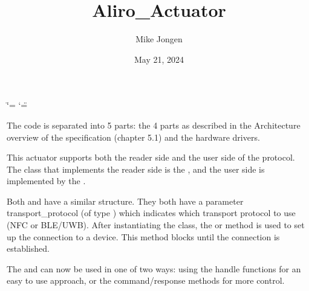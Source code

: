 \documentclass[letterpaper,10pt,english]{sphinxmanual}
\title{Aliro\_Actuator}
\date{May 21, 2024}
\author{Mike Jongen}
\begin{document}
\ifdefined\shorthandoff
  \ifnum\catcode`\=\string=\active\shorthandoff{=}\fi
  \ifnum\catcode`\"=\active{}\fi
\fi

\pagestyle{empty}
\sphinxmaketitle
\pagestyle{plain}
\sphinxtableofcontents
\pagestyle{normal}
\label{\detokenize{index::doc}}


\sphinxAtStartPar
The code is separated into 5 parts: the 4 parts as described in the Architecture
overview of the specification (chapter 5.1) and the hardware drivers.

\sphinxAtStartPar
This actuator supports both the reader side and the user side of the protocol. The class
that implements the reader side is the
{\hyperref[\detokenize{aliro_actuator.access_protocol.reader:aliro_actuator.access_protocol.reader.Reader}]{}}, and the user side is
implemented by the {\hyperref[\detokenize{aliro_actuator.access_protocol.user_device:aliro_actuator.access_protocol.user_device.UserDevice}]{}}.

\sphinxAtStartPar
Both {\hyperref[\detokenize{aliro_actuator.access_protocol.reader:aliro_actuator.access_protocol.reader.Reader}]{}} and
{\hyperref[\detokenize{aliro_actuator.access_protocol.user_device:aliro_actuator.access_protocol.user_device.UserDevice}]{}} have a similar structure.
They both have a parameter transport\_protocol (of type {\hyperref[\detokenize{aliro_actuator.access_protocol.defines:aliro_actuator.access_protocol.defines.TransportProtocol}]{}})
which indicates which transport protocol to use (NFC or BLE/UWB). After instantiating
the class, the {\hyperref[\detokenize{aliro_actuator.access_protocol.user_device:aliro_actuator.access_protocol.user_device.UserDevice.transaction_initiation}]{}}
or {\hyperref[\detokenize{aliro_actuator.access_protocol.reader:aliro_actuator.access_protocol.reader.Reader.transaction_initiation}]{}} method
is used to set up the connection to a device.
This method blocks until the connection is established.

\sphinxAtStartPar
The {\hyperref[\detokenize{aliro_actuator.access_protocol.user_device:aliro_actuator.access_protocol.user_device.UserDevice}]{}} and
{\hyperref[\detokenize{aliro_actuator.access_protocol.reader:aliro_actuator.access_protocol.reader.Reader}]{}} can now be used in one of
two ways: using the handle functions for an easy to use approach, or the command/response
methods for more control.
\end{document}
